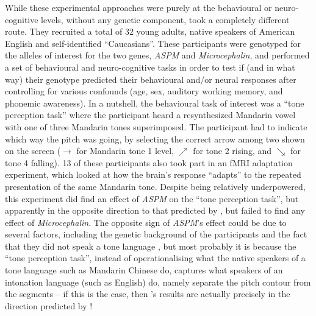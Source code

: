 \documentclass[twoside,twocolumn]{article}
\begin{document}
While these experimental approaches were purely at the behavioural or neuro-cognitive levels, without any genetic component, \citet{wong_plosone_2012} took a completely different route.
They recruited a total of 32 young adults, native speakers of American English and self-identified ``Caucasians''.
These participants were genotyped for the alleles of interest for the two genes, \textit{ASPM} and \textit{Microcephalin}, and performed a set of behavioural and neuro-cognitive tasks in order to test if (and in what way) their genotype predicted their behavioural and/or neural responses after controlling for various confounds (age, sex, auditory working memory, and phonemic awareness).
In a nutshell, the behavioural task of interest was a ``tone perception task'' where the participant heard a resynthesized Mandarin vowel with one of three Mandarin tones superimposed.
The participant had to indicate which way the pitch was going, by selecting the correct arrow among two shown on the screen ($\rightarrow$ for Mandarin tone 1 level, $\nearrow$ for tone 2 rising, and $\searrow$ for tone 4 falling).
13 of these participants also took part in an fMRI adaptation experiment, which looked at how the brain's response ``adapts'' to the repeated presentation of the same Mandarin tone.
Despite being relatively underpowered, this experiment did find an effect of \textit{ASPM} on the ``tone perception task'', but apparently in the opposite direction to that predicted by \citet{dediu_ladd_2007}, but failed to find any effect of \textit{Microcephalin}.
The opposite sign of \textit{ASPM}'s effect could be due to several factors, including the genetic background of the participants and the fact that they did not speak a tone language \citet{wong_plosone_2012}, but most probably it is because the ``tone perception task'', instead of operationalising what the native speakers of a tone language such as Mandarin Chinese do, captures what speakers of an intonation language (such as English) do, namely separate the pitch contour from the segments \citep[p. 340]{caldwellharris_factors_2015} -- if this is the case, then \citet{wong_plosone_2012}'s results are actually precisely in the direction predicted by \citet{dediu_ladd_2007}!
\end{document}
